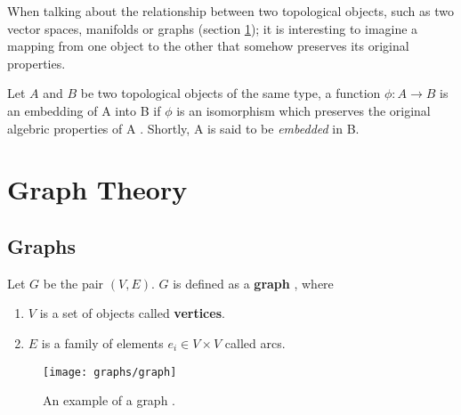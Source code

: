When talking about the relationship between two topological objects, such as two vector spaces, manifolds or graphs (section \ref{sec:graphs}); it is interesting to imagine a mapping from one object to the other that somehow preserves its original properties.

Let $A$ and $B$ be two topological objects of the same type, a function $\phi \colon A \to B$ is an embedding of A into B if $\phi$ is an isomorphism which preserves the original algebric properties of A \cite{burris2011course}. Shortly, A is said to be \textit{embedded} in B.


\section{Graph Theory}
\label{sec:graphs}
\subsection{Graphs}

Let $G$ be the pair $(V, E)$. $G$ is defined as a \textbf{graph} \cite{berge1973}, where
\begin{enumerate}
	\item $V$ is a set of objects called \textbf{vertices}.
	\item $E$ is a family of elements $e_i \in V\times V$ called arcs.
\end{enumerate}

\begin{figure}[H]
	\centering
	\texttt{[image: graphs/graph]}
	\caption{An example of a graph \protect\footnotemark.}
\end{figure}


